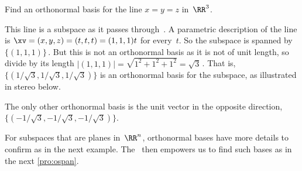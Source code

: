 \begin{example} \label{eg:orthbas1}
Find an orthonormal basis for the line \(x=y=z\) in~\(\RR^3\).
\begin{solution} 
This line is a subspace as it passes through~\ov.
A parametric description of the line is \(\xv=(x,y,z)=(t,t,t)=(1,1,1)t\) for every~\(t\). 
So the subspace is spanned by~\(\{(1,1,1)\}\)\,.
But this is not an orthonormal basis as it is not of unit length, so divide by its length \(|(1,1,1)|=\sqrt{1^2+1^2+1^2}=\sqrt3\)\,.
That is, \(\{(1/{\sqrt3},1/{\sqrt3},1/{\sqrt3})\}\) is an orthonormal basis for the subspace, as illustrated in stereo below.
\begin{center}
 {}
\end{center}
The only other orthonormal basis is the unit vector in the opposite direction,~\(\{(-1/{\sqrt3},-1/{\sqrt3},-1/{\sqrt3})\}\).
\end{solution}
\end{example}


For subspaces that are planes in~\(\RR^n\), orthonormal bases have more details to confirm as in the next example.
The \svd\ then empowers us to find such bases as in the next \autoref{pro:ospan}.


